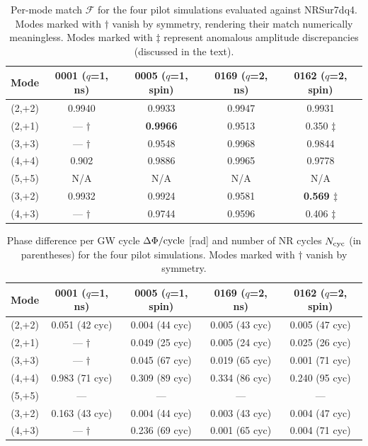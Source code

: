 \documentclass[%
 reprint,
superscriptaddress,
 amsmath,amssymb,
 aps,
]{revtex4-2}
\begin{document}
\begin{table}[t]
\centering
\caption{Per-mode match $\mathcal{F}$ for the four pilot simulations evaluated against NRSur7dq4. Modes marked with $\dagger$ vanish by symmetry, rendering their match numerically meaningless. Modes marked with $\ddagger$ represent anomalous amplitude discrepancies (discussed in the text).}
\label{tab:pilot_match}
\begin{tabular}{ccccc}
\toprule
Mode & 0001 ($q$=1, ns) & 0005 ($q$=1, spin) & 0169 ($q$=2, ns) & 0162 ($q$=2, spin) \\
\midrule
(2,+2) & 0.9940 & 0.9933 & 0.9947 & 0.9931 \\
(2,+1) & — $\dagger$ & \textbf{0.9966} & 0.9513 & 0.350 $\ddagger$ \\
(3,+3) & — $\dagger$ & 0.9548 & 0.9968 & 0.9844 \\
(4,+4) & 0.902 & 0.9886 & 0.9965 & 0.9778 \\
(5,+5) & N/A & N/A & N/A & N/A \\
(3,+2) & 0.9932 & 0.9924 & 0.9581 & \textbf{0.569 $\ddagger$} \\
(4,+3) & — $\dagger$ & 0.9744 & 0.9596 & 0.406 $\ddagger$ \\
\bottomrule
\end{tabular}
\end{table}


\begin{table}[t]
\centering
\caption{Phase difference per GW cycle $\Delta\Phi/{\rm cycle}$ [rad] and number of NR cycles $N_{\rm cyc}$ (in parentheses) for the four pilot simulations. Modes marked with $\dagger$ vanish by symmetry.}
\label{tab:pilot_phase}
\begin{tabular}{ccccc}
\toprule
Mode & 0001 ($q$=1, ns) & 0005 ($q$=1, spin) & 0169 ($q$=2, ns) & 0162 ($q$=2, spin) \\
\midrule
(2,+2) & 0.051 (42 cyc) & 0.004 (44 cyc) & 0.005 (43 cyc) & 0.005 (47 cyc) \\
(2,+1) & — $\dagger$ & 0.049 (25 cyc) & 0.005 (24 cyc) & 0.025 (26 cyc) \\
(3,+3) & — $\dagger$ & 0.045 (67 cyc) & 0.019 (65 cyc) & 0.001 (71 cyc) \\
(4,+4) & 0.983 (71 cyc) & 0.309 (89 cyc) & 0.334 (86 cyc) & 0.240 (95 cyc) \\
(5,+5) & — & — & — & — \\
(3,+2) & 0.163 (43 cyc) & 0.004 (44 cyc) & 0.003 (43 cyc) & 0.004 (47 cyc) \\
(4,+3) & — $\dagger$ & 0.236 (69 cyc) & 0.001 (65 cyc) & 0.004 (71 cyc) \\
\bottomrule
\end{tabular}
\end{table}
\end{document}
